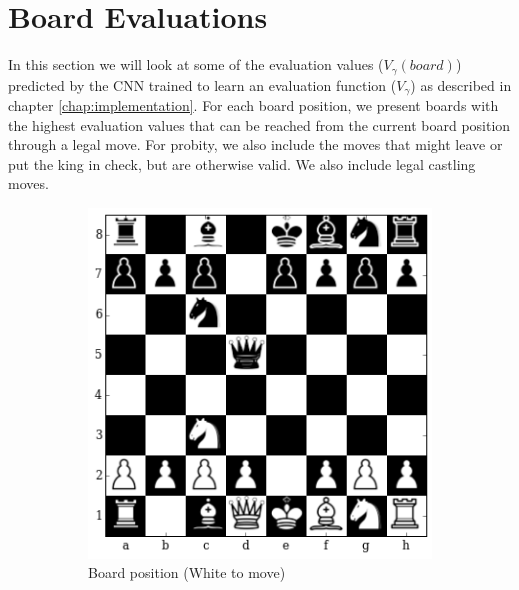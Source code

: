 \section{Board Evaluations}
\label{section:boardevaluations}
In this section we will look at some of the evaluation values 
($V_\gamma(board)$) predicted by the CNN trained to learn an evaluation 
function ($V_\gamma$) as described in chapter \ref{chap:implementation}. For 
each board position, we present boards with the highest evaluation values that 
can be reached from the current board position through a legal move. For 
probity, we also include the moves that might leave or put the king in check, 
but are otherwise valid. We also include legal castling moves.

\begin{figure}[H]
\vspace{-0.2in}
\hspace*{-0.5in}  
  \centering
    \begin{subfigure}[t]{\textwidth}
        \centering
        \includegraphics[scale=0.55]{img/table_evaluations/output_11_0.png}
        \caption{Board position (White to move)}
    \end{subfigure}%

 \hspace*{-0.5in}  
    \begin{subfigure}[t]{0.45\textwidth}
        \centering
        

\end{subfigure}
\end{figure}
